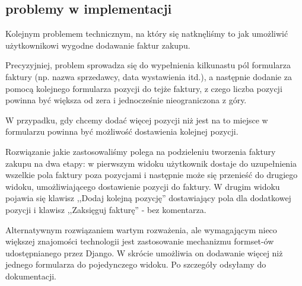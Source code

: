 \documentclass{beamer}
\begin{document}
\subsection{problemy w implementacji}
  \begin{frame}
    \begin{block}{}
      Kolejnym problemem technicznym, na który się natknęliśmy to jak umożliwić użytkownikowi wygodne dodawanie faktur zakupu.
    \end{block}
  \end{frame}
  \begin{frame}
    \begin{block}{}
      Precyzyjniej, problem sprowadza się do wypełnienia kilkunastu pól formularza faktury (np. nazwa sprzedawcy, data wystawienia itd.), a następnie dodanie za pomocą kolejnego formularza pozycji do tejże faktury, z czego liczba pozycji powinna być większa od zera i jednocześnie nieograniczona z góry.
    \end{block}
  \end{frame}
  \begin{frame}
    \begin{block}{}
      W przypadku, gdy chcemy dodać więcej pozycji niż jest na to miejsce w formularzu powinna być możliwość dostawienia kolejnej pozycji.
    \end{block}
  \end{frame}
  \begin{frame}
    \begin{block}{}
      Rozwiązanie jakie zastosowaliśmy polega na podzieleniu tworzenia faktury zakupu na dwa etapy: w pierwszym widoku użytkownik dostaje do uzupełnienia wszelkie pola faktury poza pozycjami i następnie może się przenieść do drugiego widoku, umożliwiającego dostawienie pozycji do faktury. W drugim widoku pojawia się klawisz ,,Dodaj kolejną pozycję'' dostawiający pola dla dodatkowej pozycji i klawisz ,,Zaksięguj fakturę'' - bez komentarza.
    \end{block}
  \end{frame}
  \begin{frame}
    \begin{block}{}
      Alternatywnym rozwiązaniem wartym rozważenia, ale wymagającym nieco większej znajomości technologii jest zastosowanie mechanizmu formset-ów udostępnianego przez Django. W skrócie umożliwia on dodawanie więcej niż jednego formularza do pojedynczego widoku. Po szczegóły odsyłamy do dokumentacji.
    \end{block}
  \end{frame}
\end{document}
